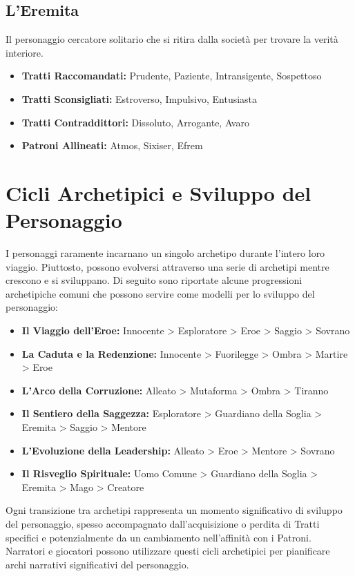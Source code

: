 \begin{multicols}{2}
\subsection*{L'Eremita}
Il personaggio cercatore solitario che si ritira dalla società per trovare la verità interiore.

\noindent\begin{itemize}[leftmargin=*] \setlength{\itemsep}{0pt}
\item \textbf{Tratti Raccomandati:} Prudente, Paziente, Intransigente, Sospettoso
\item \textbf{Tratti Sconsigliati:} Estroverso, Impulsivo, Entusiasta
\item \textbf{Tratti Contraddittori:} Dissoluto, Arrogante, Avaro
\item \textbf{Patroni Allineati:} Atmos, Sixiser, Efrem
\end{itemize}

\section*{Cicli Archetipici e Sviluppo del Personaggio}

I personaggi raramente incarnano un singolo archetipo durante l'intero loro viaggio. Piuttosto, possono evolversi attraverso una serie di archetipi mentre crescono e si sviluppano. Di seguito sono riportate alcune progressioni archetipiche comuni che possono servire come modelli per lo sviluppo del personaggio:

\noindent\begin{itemize}[leftmargin=*] \setlength{\itemsep}{0pt}
\item \textbf{Il Viaggio dell'Eroe:} Innocente > Esploratore > Eroe > Saggio > Sovrano
\item \textbf{La Caduta e la Redenzione:} Innocente > Fuorilegge > Ombra > Martire > Eroe
\item \textbf{L'Arco della Corruzione:} Alleato > Mutaforma > Ombra > Tiranno
\item \textbf{Il Sentiero della Saggezza:} Esploratore > Guardiano della Soglia > Eremita > Saggio > Mentore
\item \textbf{L'Evoluzione della Leadership:} Alleato > Eroe > Mentore > Sovrano
\item \textbf{Il Risveglio Spirituale:} Uomo Comune > Guardiano della Soglia > Eremita > Mago > Creatore
\end{itemize}

Ogni transizione tra archetipi rappresenta un momento significativo di sviluppo del personaggio, spesso accompagnato dall'acquisizione o perdita di Tratti specifici e potenzialmente da un cambiamento nell'affinità con i Patroni. Narratori e giocatori possono utilizzare questi cicli archetipici per pianificare archi narrativi significativi del personaggio.


\end{multicols}
